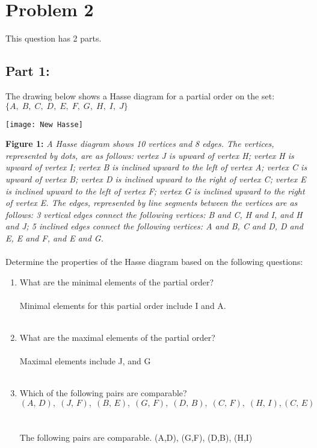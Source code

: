   \section*{Problem 2}
 \noindent
 This question has 2 parts.
 \subsection*{Part 1:}
 The drawing below shows a Hasse diagram for a partial order on the set:
 \\
   $\{A, \;B,\; C,\; D,\; E,\; F,\; G,\; H,\; I, \; J\}$
 \begin{center}
 \texttt{[image: New Hasse]}
 \end{center}
 {\color{blue} {\bf Figure 1:} \emph{A Hasse diagram shows 10 vertices and 8 edges. The vertices, represented by dots, are as follows:  vertex J is upward of vertex H; vertex H is upward of vertex I; vertex B is inclined upward to the left of vertex A; vertex C is upward of vertex B; vertex D is inclined upward to the right of vertex C; vertex E is inclined upward to the left of vertex F; vertex G is inclined upward to the right of vertex E. The edges, represented by line segments between the vertices are as follows: 3 vertical edges connect the following vertices: B and C, H and I, and H and J; 5 inclined edges connect the following vertices: A and B, C and D, D and E, E and F, and E and G. 
  }
  }
  \\\\
 Determine the properties of the Hasse diagram based on the following questions:

  \begin{enumerate}[label=(\alph*)]
    \item What are the minimal elements of the partial order?
\\\\
  Minimal elements for this partial order include I and A. 
\\\\
    \item What are the maximal elements of the partial order?
\\\\
  Maximal elements include J, and G
\\\\
    \item Which of the following pairs are comparable?
\[(A,\, D),\; (J,\, F),\; (B,\, E),\; (G,\, F),\; (D,\, B),\; (C,\, F),\; (H,\, I), (C,\, E)\]
\\\\
  The following pairs are comparable. (A,D), (G,F), (D,B), (H,I)
\\\\
   \end{enumerate}
   \newpage


